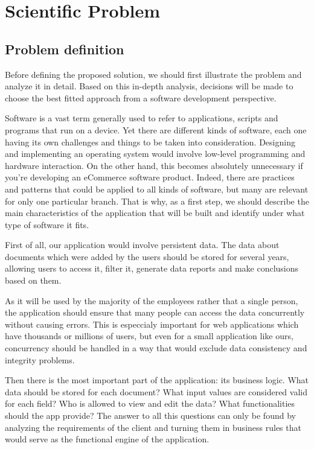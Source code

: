 \chapter{Scientific Problem}
\label{section:scientificProblem}


\section{Problem definition}
\label{section:problemDefinition}

Before defining the proposed solution, we should first illustrate the problem and analyze it in detail. Based on this in-depth analysis, decisions will be made to choose the best fitted approach from a software development perspective.

Software is a vast term generally used to refer to applications, scripts and programs that run on a device. Yet there are different kinds of software, each one having its own challenges and things to be taken into consideration. Designing and implementing an operating system would involve low-level programming and hardware interaction. On the other hand, this becomes absolutely unnecessary if you're developing an eCommerce software product. Indeed, there are practices and patterns that could be applied to all kinds of software, but many are relevant for only one particular branch. That is why, as a first step, we should describe the main characteristics of the application that will be built and identify under what type of software it fits.

First of all, our application would involve persistent data. The data about documents which were added by the users should be stored for several years, allowing users to access it, filter it, generate data reports and make conclusions based on them.

As it will be used by the majority of the employees rather that a single person, the application should ensure that many people can access the data concurrently without causing errors. This is especcialy important for web applications which have thousands or millions of users, but even for a small application like ours, concurrency should be handled in a way that would exclude data consistency and integrity problems.

Then there is the most important part of the application: its business logic. What data should be stored for each document? What input values are considered valid for each field? Who is allowed to view and edit the data? What functionalities should the app provide? The answer to all this questions can only be found by analyzing the requirements of the client and turning them in business rules that would serve as the functional engine of the application.

